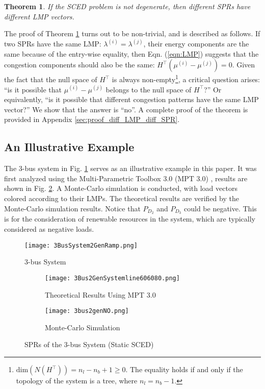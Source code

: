 \documentclass[letterpaper, 11pt]{article}
\theoremstyle{plain}
\newtheorem{thm}{Theorem}
\theoremstyle{definition}
\begin{document}
\begin{thm}
\label{thm:diff_LMPs}
If the SCED problem is not degenerate, then different SPRs have different LMP vectors.
\end{thm}
The proof of Theorem \ref{thm:diff_LMPs} turns out to be non-trivial, and is described as follows. 
If two SPRs have the same LMP: $\lambda^{(i)} = \lambda^{(j)}$, their energy components are the same because of the entry-wise equality, then Eqn. (\ref{eqn:LMP}) suggests that the congestion components should also be the same: $H^\intercal (\mu^{(i)} - \mu^{(j)}) = 0$. Given the fact that the null space of $H^\intercal$ is always non-empty\footnote{$\text{dim}(N(H^\intercal)) = n_l - n_b +1 \ge 0$. The equality holds if and only if the topology of the system is a tree, where $n_l = n_b -1$.}, a critical question arises: ``is it possible that $\mu^{(i)} - \mu^{(j)}$ belongs to the null space of $H^\intercal$?'' Or equivalently, ``is it possible that different congestion patterns have the same LMP vector?''
We show that the answer is ``no''. A complete proof of the theorem is provided in Appendix \ref{sec:proof_diff_LMP_diff_SPR}.

\subsection{An Illustrative Example} \label{sub:an_illustrative_example}
The 3-bus system in Fig. \ref{fig:3Bus2GeneSystem} serves as an illustrative example in this paper. It was first analyzed using the Multi-Parametric Toolbox 3.0 (MPT 3.0) \cite{Herceg2013}, results are shown in Fig. \ref{fig:SPR_3bus_mpt}. A Monte-Carlo simulation is conducted, with load vectors colored according to their LMPs. The theoretical results are verified by the Monte-Carlo simulation results.
Notice that $P_{D_2}$ and $P_{D_3}$ could be negative. This is for the consideration of renewable resources in the system, which are typically considered as negative loads. 

\begin{figure}[htbp]
  \centering
  \texttt{[image: 3BusSystem2GenRamp.png]}
  \caption{3-bus System}
  \label{fig:3Bus2GeneSystem}
\end{figure}  


\begin{figure}[htbp]
  \centering
  \begin{subfigure}[t]{0.49\linewidth}
  \centering
  \texttt{[image: 3Bus2GenSystemline606080.png]}
  \caption{Theoretical Results Using MPT 3.0}
  \label{fig:SPR_3bus_mpt}
  \end{subfigure}
  \begin{subfigure}[t]{0.49\linewidth}
  \centering
  \texttt{[image: 3bus2genNO.png]} 
  \caption{Monte-Carlo Simulation}
  \label{fig:SPR_3busNO_mc}
  \end{subfigure}
  \caption{SPRs of the 3-bus System (Static SCED)}
\end{figure}  
\end{document}
